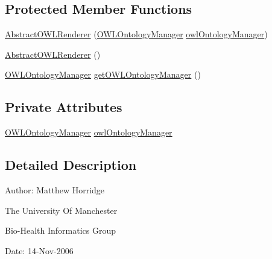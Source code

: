 \subsection*{Protected Member Functions}
\begin{DoxyCompactItemize}
\item 
\hyperlink{classorg_1_1semanticweb_1_1owlapi_1_1io_1_1_abstract_o_w_l_renderer_adbe3f5841417472101e7b083b4543f71}{Abstract\-O\-W\-L\-Renderer} (\hyperlink{interfaceorg_1_1semanticweb_1_1owlapi_1_1model_1_1_o_w_l_ontology_manager}{O\-W\-L\-Ontology\-Manager} \hyperlink{classorg_1_1semanticweb_1_1owlapi_1_1io_1_1_abstract_o_w_l_renderer_abb9888586f19a7a923cba542d99f1556}{owl\-Ontology\-Manager})
\item 
\hyperlink{classorg_1_1semanticweb_1_1owlapi_1_1io_1_1_abstract_o_w_l_renderer_ac0e7845d8c5aafd92f280205d3ff229d}{Abstract\-O\-W\-L\-Renderer} ()
\item 
\hyperlink{interfaceorg_1_1semanticweb_1_1owlapi_1_1model_1_1_o_w_l_ontology_manager}{O\-W\-L\-Ontology\-Manager} \hyperlink{classorg_1_1semanticweb_1_1owlapi_1_1io_1_1_abstract_o_w_l_renderer_ab2c6c4450d73baaa033b965f89be9cc0}{get\-O\-W\-L\-Ontology\-Manager} ()
\end{DoxyCompactItemize}
\subsection*{Private Attributes}
\begin{DoxyCompactItemize}
\item 
\hyperlink{interfaceorg_1_1semanticweb_1_1owlapi_1_1model_1_1_o_w_l_ontology_manager}{O\-W\-L\-Ontology\-Manager} \hyperlink{classorg_1_1semanticweb_1_1owlapi_1_1io_1_1_abstract_o_w_l_renderer_abb9888586f19a7a923cba542d99f1556}{owl\-Ontology\-Manager}
\end{DoxyCompactItemize}


\subsection{Detailed Description}
Author\-: Matthew Horridge\par
 The University Of Manchester\par
 Bio-\/\-Health Informatics Group\par
 Date\-: 14-\/\-Nov-\/2006\par
\par
 

